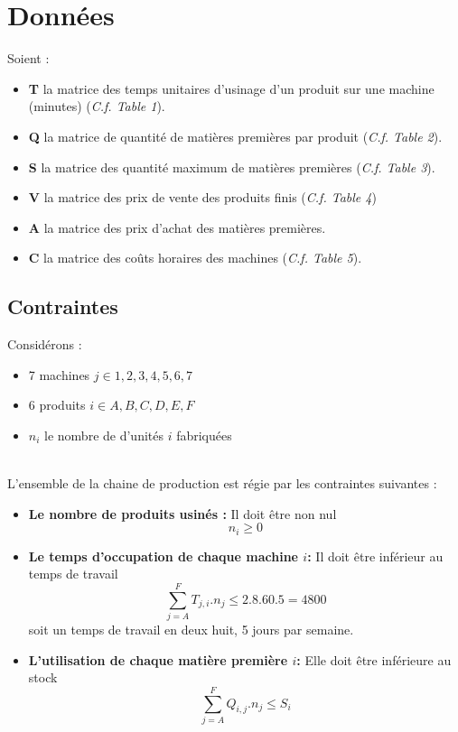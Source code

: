 
\section{Données}
Soient :
\begin{itemize}
  \item \textbf{T} la matrice des temps unitaires d'usinage d'un produit sur une
  machine (minutes) (\textsl{C.f. Table 1}).
  \item \textbf{Q} la matrice de quantité de matières premières par produit
  (\textsl{C.f. Table 2}).
  \item \textbf{S} la matrice des quantité maximum de matières premières
  (\textsl{C.f. Table 3}).
  \item \textbf{V} la matrice des prix de vente des produits finis (\textsl{C.f.
  Table 4})
  \item \textbf{A} la matrice des prix d'achat des matières premières.
  \item \textbf{C} la matrice des coûts horaires des machines (\textsl{C.f.
  Table 5}).
\end{itemize}

\subsection{Contraintes}
Considérons :
\begin{itemize}
  \item 7 machines $j \in {1, 2, 3, 4, 5, 6 ,7}$
  \item 6 produits $i \in {A, B, C, D, E, F}$
  \item $n_i$ le nombre de d'unités $i$ fabriquées
\end{itemize}
~\\
L'ensemble de la chaine de production est régie par les contraintes suivantes
:\\
\begin{itemize}
  \item \textbf{Le nombre de produits usinés :} Il doit être non nul
  \begin{equation} 
  	n_i \ge 0 \label{C0}
  \end{equation}
  
  \item \textbf{Le temps d'occupation de chaque machine $i$:} Il doit être
  inférieur au temps de travail
  \begin{equation} 
  	\sum_{j = A}^{F} T_{j,i} . n_j \leq 2.8.60.5 = 4800 \label{C1}
  \end{equation} 
  soit un temps de travail en deux huit, 5 jours par semaine.
  
  \item \textbf{L'utilisation de chaque matière première  $i$:} Elle doit être
  inférieure au stock
  \begin{equation} 
  	\sum_{j = A}^{F} Q_{i,j} . n_j \leq S_i \label{C2}
  \end{equation} 
\end{itemize}

